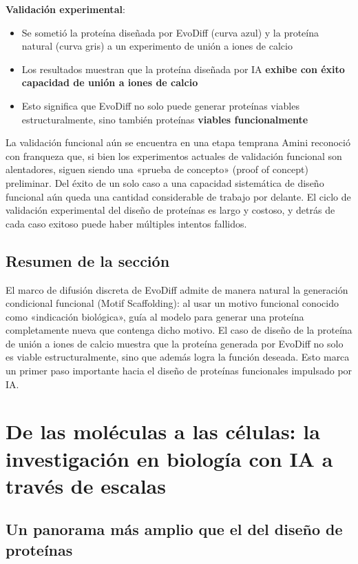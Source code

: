 \documentclass[a4paper]{article}
\begin{document}
\textbf{Validación experimental}:
\begin{itemize}
    \item Se sometió la proteína diseñada por EvoDiff (curva azul) y la proteína natural (curva gris) a un experimento de unión a iones de calcio
    \item Los resultados muestran que la proteína diseñada por IA \textbf{exhibe con éxito capacidad de unión a iones de calcio}
    \item Esto significa que EvoDiff no solo puede generar proteínas viables estructuralmente, sino también proteínas \textbf{viables funcionalmente}
\end{itemize}

\begin{warningbox}{La validación funcional aún se encuentra en una etapa temprana}
Amini reconoció con franqueza que, si bien los experimentos actuales de validación funcional son alentadores, siguen siendo una «prueba de concepto» (proof of concept) preliminar. Del éxito de un solo caso a una capacidad sistemática de diseño funcional aún queda una cantidad considerable de trabajo por delante. El ciclo de validación experimental del diseño de proteínas es largo y costoso, y detrás de cada caso exitoso puede haber múltiples intentos fallidos.
\end{warningbox}

\subsection{Resumen de la sección}

El marco de difusión discreta de EvoDiff admite de manera natural la generación condicional funcional (Motif Scaffolding): al usar un motivo funcional conocido como «indicación biológica», guía al modelo para generar una proteína completamente nueva que contenga dicho motivo. El caso de diseño de la proteína de unión a iones de calcio muestra que la proteína generada por EvoDiff no solo es viable estructuralmente, sino que además logra la función deseada. Esto marca un primer paso importante hacia el diseño de proteínas funcionales impulsado por IA.
\section{De las moléculas a las células: la investigación en biología con IA a través de escalas}

\subsection{Un panorama más amplio que el del diseño de proteínas}
\end{document}
